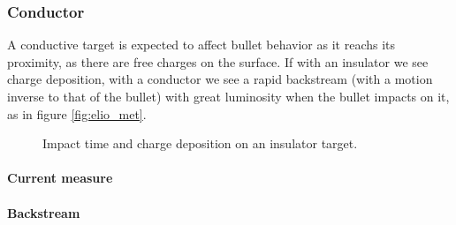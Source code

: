 \subsubsection{Conductor}
A conductive target is expected to affect bullet behavior as it reachs its proximity, as there are free charges on the surface. If with an insulator we see charge deposition, with a conductor we see a rapid backstream (with a motion inverse to that of the bullet) with great luminosity when the bullet impacts on it, as in figure \ref{fig:elio_met}.
\begin{figure}
 \centering
 \hfill
 \hfill
 \caption{Impact time and charge deposition on an insulator target.}
 \label{fig:elio_ins}
\end{figure}


\paragraph{Current measure}

\paragraph{Backstream}

